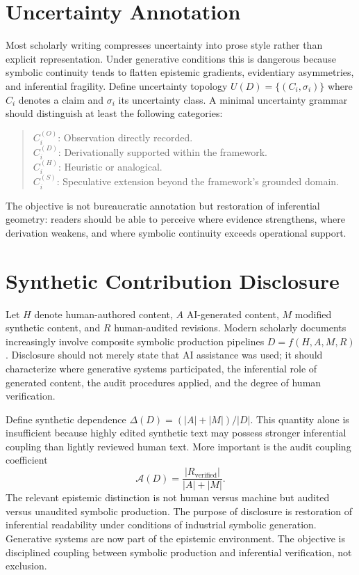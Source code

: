 \documentclass[12pt, openright, twoside]{book}
\begin{document}
\section{Uncertainty Annotation}

Most scholarly writing compresses uncertainty into prose style rather than
explicit representation. Under generative conditions this is dangerous
because symbolic continuity tends to flatten epistemic gradients,
evidentiary asymmetries, and inferential fragility. Define uncertainty
topology $U(D) = \{(C_i, \sigma_i)\}$ where $C_i$ denotes a claim and
$\sigma_i$ its uncertainty class. A minimal uncertainty grammar should
distinguish at least the following categories:

\begin{quote}
$C_i^{(O)}$: Observation directly recorded. \\
$C_i^{(D)}$: Derivationally supported within the framework. \\
$C_i^{(H)}$: Heuristic or analogical. \\
$C_i^{(S)}$: Speculative extension beyond the framework's grounded domain.
\end{quote}

The objective is not bureaucratic annotation but restoration of inferential
geometry: readers should be able to perceive where evidence strengthens,
where derivation weakens, and where symbolic continuity exceeds operational
support.

\section{Synthetic Contribution Disclosure}

Let $H$ denote human-authored content, $A$ AI-generated content, $M$
modified synthetic content, and $R$ human-audited revisions. Modern
scholarly documents increasingly involve composite symbolic production
pipelines $D = f(H, A, M, R)$. Disclosure should not merely state that
AI assistance was used; it should characterize where generative systems
participated, the inferential role of generated content, the audit
procedures applied, and the degree of human verification.

Define synthetic dependence $\Delta(D) = (|A| + |M|) / |D|$. This
quantity alone is insufficient because highly edited synthetic text may
possess stronger inferential coupling than lightly reviewed human text.
More important is the audit coupling coefficient
\[
\mathcal{A}(D)
= \frac{|R_{\mathrm{verified}}|}{|A| + |M|}.
\]
The relevant epistemic distinction is not human versus machine but audited
versus unaudited symbolic production. The purpose of disclosure is
restoration of inferential readability under conditions of industrial
symbolic generation. Generative systems are now part of the epistemic
environment. The objective is disciplined coupling between symbolic
production and inferential verification, not exclusion.
\end{document}
